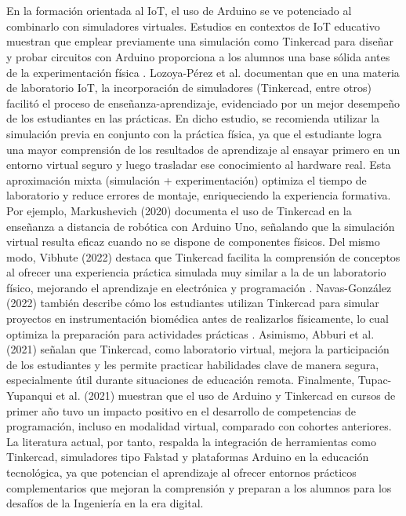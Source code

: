 \documentclass{article}
\begin{document}
\\\\
En la formación orientada al IoT, el uso de Arduino se ve potenciado al combinarlo con simuladores virtuales. Estudios en contextos de IoT educativo muestran que emplear previamente una simulación como Tinkercad para diseñar y probar circuitos con Arduino proporciona a los alumnos una base sólida antes de la experimentación física \cite{Lozoya2022}. Lozoya-Pérez et al. \cite{Lozoya2022} documentan que en una materia de laboratorio IoT, la incorporación de simuladores (Tinkercad, entre otros) facilitó el proceso de enseñanza-aprendizaje, evidenciado por un mejor desempeño de los estudiantes en las prácticas. En dicho estudio, se recomienda utilizar la simulación previa en conjunto con la práctica física, ya que el estudiante logra una mayor comprensión de los resultados de aprendizaje al ensayar primero en un entorno virtual seguro y luego trasladar ese conocimiento al hardware real. Esta aproximación mixta (simulación + experimentación) optimiza el tiempo de laboratorio y reduce errores de montaje, enriqueciendo la experiencia formativa. Por ejemplo, Markushevich (2020)\cite{markushevich2020} documenta el uso de Tinkercad en la enseñanza a distancia de robótica con Arduino Uno, señalando que la simulación virtual resulta eficaz cuando no se dispone de componentes físicos. Del mismo modo, Vibhute (2022) destaca que Tinkercad facilita la comprensión de conceptos al ofrecer una experiencia práctica simulada muy similar a la de un laboratorio físico, mejorando el aprendizaje en electrónica y programación \cite{vibhute2022}. Navas-González (2022) también describe cómo los estudiantes utilizan Tinkercad para simular proyectos en instrumentación biomédica antes de realizarlos físicamente, lo cual optimiza la preparación para actividades prácticas \cite{navas2022}. Asimismo, Abburi et al. (2021) \cite{abburi2021} señalan que Tinkercad, como laboratorio virtual, mejora la participación de los estudiantes y les permite practicar habilidades clave de manera segura, especialmente útil durante situaciones de educación remota. Finalmente, Tupac-Yupanqui et al. (2021) \cite{tupac2021} muestran que el uso de Arduino y Tinkercad en cursos de primer año tuvo un impacto positivo en el desarrollo de competencias de programación, incluso en modalidad virtual, comparado con cohortes anteriores. La literatura actual, por tanto, respalda la integración de herramientas como Tinkercad, simuladores tipo Falstad y plataformas Arduino en la educación tecnológica, ya que potencian el aprendizaje al ofrecer entornos prácticos complementarios que mejoran la comprensión y preparan a los alumnos para los desafíos de la Ingeniería en la era digital.
\end{document}
